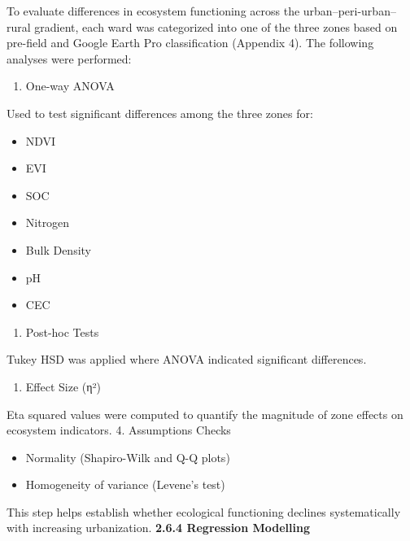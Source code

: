 To evaluate differences in ecosystem functioning across the urban--peri-urban--rural gradient, each ward was categorized into one of the three zones based on pre-field and Google Earth Pro classification (Appendix 4). The following analyses were performed:
\begin{enumerate}
\def\labelenumi{\arabic{enumi}.}
\item
One-way ANOVA
\end{enumerate}

Used to test significant differences among the three zones for:
\begin{itemize}
\item
  NDVI
\item
  EVI
\item
  SOC
\item
  Nitrogen
\item
  Bulk Density
\item
  pH
\item
  CEC
\end{itemize}

\begin{enumerate}
\def\labelenumi{\arabic{enumi}.}
\setcounter{enumi}{1}
\item
Post-hoc Tests
\end{enumerate}

Tukey HSD was applied where ANOVA indicated significant differences.
\begin{enumerate}
\def\labelenumi{\arabic{enumi}.}
\setcounter{enumi}{2}
\item
Effect Size (η²)
\end{enumerate}

Eta squared values were computed to quantify the magnitude of zone effects on ecosystem indicators.
4. Assumptions Checks

\begin{itemize}
\item
  Normality (Shapiro-Wilk and Q-Q plots)
\item
  Homogeneity of variance (Levene's test)
\end{itemize}

This step helps establish whether ecological functioning declines systematically with increasing urbanization.
{}\textbf{2.6.4 Regression Modelling}

